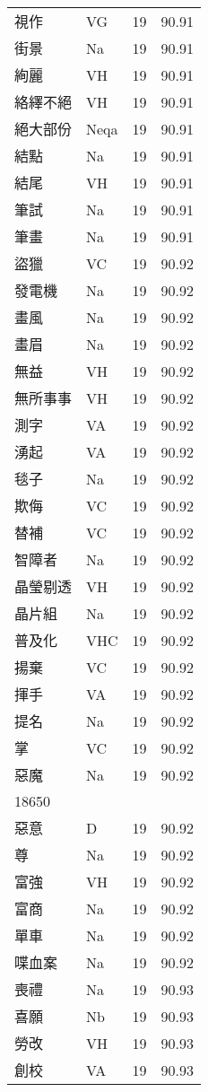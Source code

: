 \documentclass[twocolumn]{book}
\begin{document}
\begin{supertabular}{llrr}
視作 & VG & 19 &  90.91\\
街景 & Na & 19 &  90.91\\
絢麗 & VH & 19 &  90.91\\
絡繹不絕 & VH & 19 &  90.91\\
絕大部份 & Neqa & 19 &  90.91\\
結點 & Na & 19 &  90.91\\
結尾 & VH & 19 &  90.91\\
筆試 & Na & 19 &  90.91\\
筆畫 & Na & 19 &  90.91\\
盜獵 & VC & 19 &  90.92\\
發電機 & Na & 19 &  90.92\\
畫風 & Na & 19 &  90.92\\
畫眉 & Na & 19 &  90.92\\
無益 & VH & 19 &  90.92\\
無所事事 & VH & 19 &  90.92\\
測字 & VA & 19 &  90.92\\
湧起 & VA & 19 &  90.92\\
毯子 & Na & 19 &  90.92\\
欺侮 & VC & 19 &  90.92\\
替補 & VC & 19 &  90.92\\
智障者 & Na & 19 &  90.92\\
晶瑩剔透 & VH & 19 &  90.92\\
晶片組 & Na & 19 &  90.92\\
普及化 & VHC & 19 &  90.92\\
揚棄 & VC & 19 &  90.92\\
揮手 & VA & 19 &  90.92\\
提名 & Na & 19 &  90.92\\
掌 & VC & 19 &  90.92\\
惡魔 & Na & 19 &  90.92\\
18650\\
惡意 & D & 19 &  90.92\\
尊 & Na & 19 &  90.92\\
富強 & VH & 19 &  90.92\\
富商 & Na & 19 &  90.92\\
單車 & Na & 19 &  90.92\\
喋血案 & Na & 19 &  90.92\\
喪禮 & Na & 19 &  90.93\\
喜願 & Nb & 19 &  90.93\\
勞改 & VH & 19 &  90.93\\
創校 & VA & 19 &  90.93\\

\end{supertabular}
\end{document}
